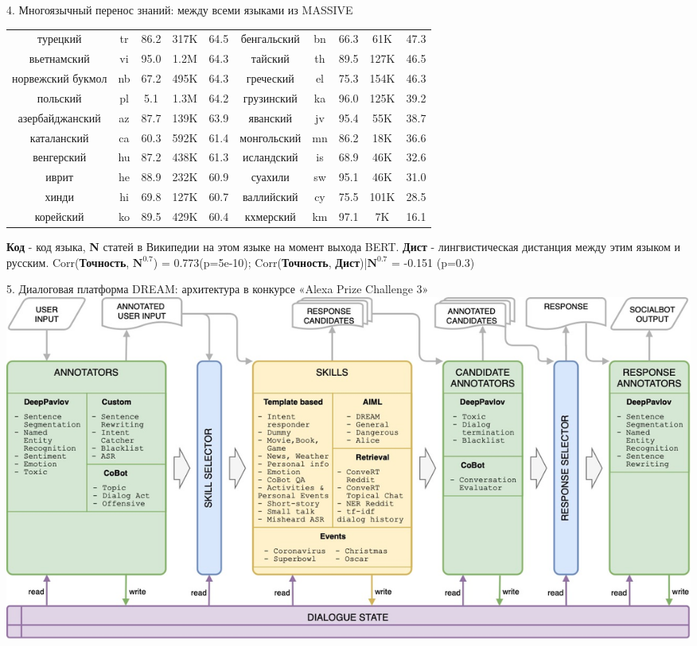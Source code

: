 \begin{frame}{4. Многоязычный перенос знаний: между всеми языками из MASSIVE}
{\begin{tabular}[baseline={(0,2.1)}]{|c|c|c|c|c||c|c|c|c|c|}
турецкий & tr & 86.2 & 317K & 64.5 & бенгальский & bn & 66.3 & 61K & 47.3 \\
вьетнамский & vi & 95.0 & 1.2M & 64.3 & тайский & th & 89.5 & 127K & 46.5 \\
норвежский букмол & nb & 67.2 & 495K & 64.3 & греческий & el & 75.3 & 154K & 46.3 \\
польский & pl & 5.1 & 1.3M & 64.2 & грузинский & ka & 96.0 & 125K & 39.2\\
азербайджанский & az & 87.7 & 139K & 63.9 & яванский & jv & 95.4 & 55K & 38.7 \\
каталанский & ca & 60.3 & 592K & 61.4 & монгольский & mn & 86.2 & 18K & 36.6 \\
венгерский & hu & 87.2 & 438K & 61.3 & исландский & is & 68.9 & 46K & 32.6 \\
иврит & he & 88.9 & 232K & 60.9 & суахили & sw & 95.1 & 46K & 31.0 \\
хинди & hi & 69.8 & 127K & 60.7 & валлийский & cy & 75.5 & 101K & 28.5 \\
корейский & ko & 89.5 & 429K & 60.4 & кхмерский & km & 97.1 & 7K & 16.1\\ \hline
\end{tabular}}
\newline
\scriptsize \textbf{Код} - код языка, \textbf{N} статей в Википедии на этом языке на момент выхода BERT.
\newline \textbf{Дист} - лингвистическая дистанция между этим языком и русским.
\newline
Corr(\textbf{Точность}, $\textbf{N}^{0.7}$) = 0.773(p=5e-10); 
Corr(\textbf{Точность}, \textbf{Дист})|$\textbf{N}^{0.7}$ = -0.151 (p=0.3)
\end{frame}


\begin{frame}{5. Диалоговая платформа DREAM: архитектура в конкурсе «Alexa Prize Challenge 3»}    
    \centering
    \includegraphics[width=1\linewidth]{images/Alexa1_.png} 
\end{frame}

